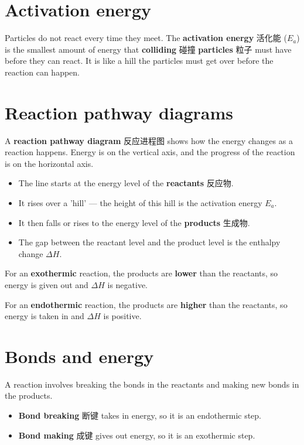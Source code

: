 \documentclass[11pt]{article}
\begin{document}
\section*{Activation energy}

Particles do not react every time they meet. The \textbf{activation energy} 活化能 ($E_a$) is the smallest amount of energy that \textbf{colliding} 碰撞 \textbf{particles} 粒子 must have before they can react. It is like a hill the particles must get over before the reaction can happen.

\section*{Reaction pathway diagrams}

A \textbf{reaction pathway diagram} 反应进程图 shows how the energy changes as a reaction happens. Energy is on the vertical axis, and the progress of the reaction is on the horizontal axis.

\begin{itemize}
\item The line starts at the energy level of the \textbf{reactants} 反应物.

\item It rises over a 'hill' — the height of this hill is the activation energy $E_a$.

\item It then falls or rises to the energy level of the \textbf{products} 生成物.

\item The gap between the reactant level and the product level is the enthalpy change $\Delta H$.

\end{itemize}

For an \textbf{exothermic} reaction, the products are \textbf{lower} than the reactants, so energy is given out and $\Delta H$ is negative.

For an \textbf{endothermic} reaction, the products are \textbf{higher} than the reactants, so energy is taken in and $\Delta H$ is positive.

\section*{Bonds and energy}

A reaction involves breaking the bonds in the reactants and making new bonds in the products.

\begin{itemize}
\item \textbf{Bond breaking} 断键 takes in energy, so it is an endothermic step.

\item \textbf{Bond making} 成键 gives out energy, so it is an exothermic step.

\end{itemize}
\end{document}
